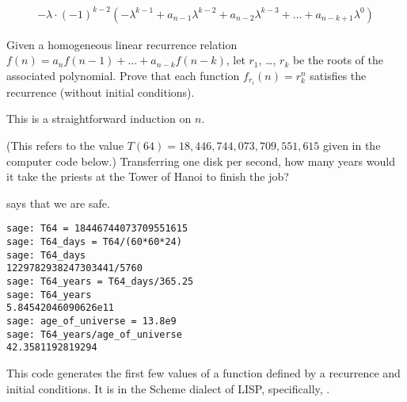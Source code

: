 \begin{exercises}
\begin{answer}
\begin{multline*}
        -\lambda\cdot
         (-1)^{k-2}(-\lambda^{k-1}+a_{n-1}\lambda^{k-2}+a_{n-2}\lambda^{k-3}       
               +\dots+a_{n-k+1}\lambda^0)
      \end{multline*}
    \end{answer}
  \item \label{exer:SoltnsLinRecur}
    Given a homogeneous linear recurrence relation
    $f(n)=a_nf(n-1)+\dots+a_{n-k}f(n-k)$, let $r_1$, \ldots, $r_k$ be the
    roots of the associated polynomial.
    Prove that each function 
         $f_{r_i}(n)=r_k^n$
         satisfies the recurrence (without initial conditions).
    \begin{answer}
       This is a straightforward induction on $n$.
    \end{answer}
  \item 
    (This refers to the value $T(64)=18,446,744,073,709,551,615$
    given in the computer code below.)
    Transferring one disk per second, how many years would it take
    the priests at the Tower of Hanoi to finish the job?
    \begin{answer}
      \Sage{} says that we are safe.
\begin{lstlisting}
sage: T64 = 18446744073709551615
sage: T64_days = T64/(60*60*24)
sage: T64_days
1229782938247303441/5760
sage: T64_years = T64_days/365.25
sage: T64_years
5.84542046090626e11        
sage: age_of_universe = 13.8e9
sage: T64_years/age_of_universe
42.3581192819294
\end{lstlisting}
    \end{answer}

\end{exercises}

\announcecomputercode
This code generates the first few values of a function 
defined by a recurrence and initial conditions.
It is in the Scheme dialect of LISP,
specifically, \cite{ChickenScheme}.

